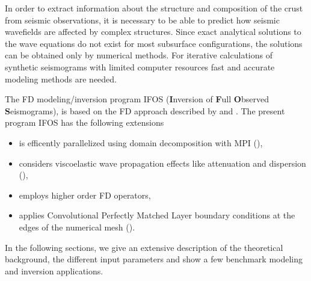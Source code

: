 In order to extract information about the structure and composition of the crust from seismic observations, it is necessary to be able to predict how seismic wavefields are affected by complex structures.
Since exact analytical solutions to the wave equations do not exist for most subsurface configurations, the solutions can be obtained only by numerical methods. For iterative calculations of synthetic seismograms with limited computer resources fast and accurate modeling methods are needed. 

The FD modeling/inversion program IFOS (\textbf{I}nversion of \textbf{F}ull \textbf{O}bserved \textbf{S}eismograms), is based on the FD approach described by \cite{virieux:86} and \cite{levander:88}. The present program IFOS has the following extensions

\begin{itemize}
\item is efficently parallelized using domain decomposition with MPI (\cite{bohlen:02}),
\item considers viscoelastic wave propagation effects like attenuation and dispersion
(\cite{robertsson:94,blanch:95,bohlen:02}),
\item employs higher order FD operators,
\item applies Convolutional Perfectly Matched Layer boundary conditions at the edges of the numerical mesh (\cite{komatitsch:07}).
\end{itemize}

In the following sections, we give an extensive description of the theoretical background, the different input parameters and show a few benchmark modeling and inversion applications.